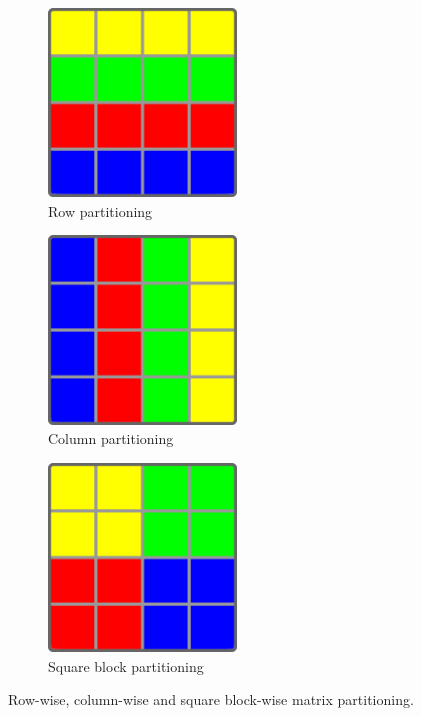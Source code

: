 \begin{figure}[htbp]
	\centering
	\begin{subfigure}{.3\linewidth}
		\centering
		\includegraphics[width=0.55\textwidth]{images/rowPartitioning.png}
		\caption{Row partitioning}
		\label{fig:rowPartitioning}
	\end{subfigure}
	\begin{subfigure}{.3\linewidth}
		\centering
		\includegraphics[width=0.55\textwidth]{images/columnPartitioning.png}
		\caption{Column partitioning}
		\label{fig:columnPartitioning}
	\end{subfigure}
	\begin{subfigure}{.3\linewidth}
		\centering
		\includegraphics[width=0.55\textwidth]{images/quadraticBlockPartitioning.png}
		\caption{Square block partitioning}
		\label{fig:quadraticBlockPartitioning}
	\end{subfigure}
	\caption{Row-wise, column-wise and square block-wise matrix partitioning.}
	\label{fig:Partitionings}
\end{figure}

